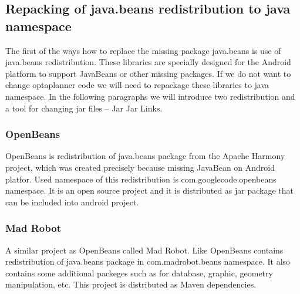 \subsection{Repacking of java.beans redistribution to java namespace}
The first of the ways how to replace the missing package java.beans is use of java.beans redistribution. These libraries are specially designed for the Android platform to support JavaBeans or other missing packages. If we do not want to change optaplanner code we will need to repackage these libraries to java namespace. In the following paragraphs we will introduce two redistribution and a tool for changing jar files -- Jar Jar Links.

\subsubsection{OpenBeans}
OpenBeans is redistribution of java.beans package from the Apache Harmony project, which was created precisely because missing JavaBean on Android platfor. Used namespace of this redistribution is com.googlecode.openbeans namespace. It is an open source project and it is distributed as jar package that can be included into android project. 

\subsubsection{Mad Robot}
A similar project as OpenBeans called Mad Robot. Like OpenBeans contains redistribution of java.beans package in com.madrobot.beans namespace. It also contains some additional packeges such as for database, graphic, geometry manipulation, etc. This project is distributed as Maven dependencies.

